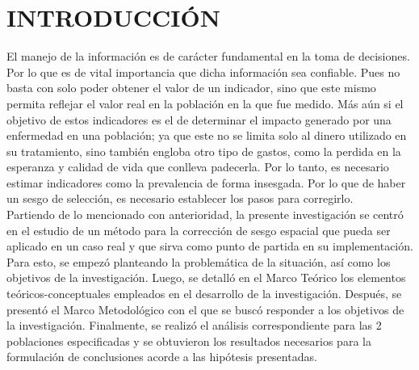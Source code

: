 \chapter*{\centering \large INTRODUCCIÓN} %

El manejo de la información es de carácter fundamental en la toma de decisiones. Por lo que es de vital importancia que dicha información sea confiable. Pues no basta con solo poder obtener el valor de un indicador, sino que este mismo permita reflejar el valor real en la población en la que fue medido. Más aún si el objetivo de estos indicadores es el de determinar el impacto generado por una enfermedad en una población; ya que este no se limita solo al dinero utilizado en su tratamiento, sino también engloba otro tipo de gastos, como la perdida en la esperanza y calidad de vida que conlleva padecerla. Por lo tanto, es necesario estimar indicadores como la prevalencia de forma insesgada. Por lo que de haber un sesgo de selección, es necesario establecer los pasos para corregirlo.\\
Partiendo de lo mencionado con anterioridad, la presente investigación se centró en el estudio de un método para la corrección de sesgo espacial que pueda ser aplicado en un caso real y que sirva como punto de partida en su implementación. Para esto, se empezó planteando la problemática de la situación, así como los objetivos de la investigación. Luego, se detalló en el Marco Teórico los elementos teóricos-conceptuales empleados en el desarrollo de la investigación. Después, se presentó el Marco Metodológico con el que se buscó responder a los objetivos de la investigación. Finalmente, se realizó el análisis correspondiente para las 2 poblaciones especificadas y se obtuvieron los resultados necesarios para la formulación de conclusiones acorde a las hipótesis presentadas.